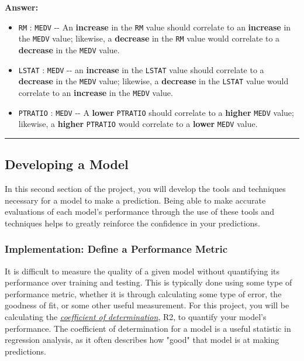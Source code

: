 \documentclass[11pt]{article}
\providecommand{\tightlist}{%
      \setlength{\itemsep}{0pt}\setlength{\parskip}{0pt}}
\begin{document}
    \textbf{Answer: }

\begin{itemize}
\tightlist
\item
  \texttt{RM} : \texttt{MEDV} -\/- An \textbf{increase} in the
  \texttt{RM} value should correlate to an \textbf{increase} in the
  \texttt{MEDV} value; likewise, a \textbf{decrease} in the \texttt{RM}
  value would correlate to a \textbf{decrease} in the \texttt{MEDV}
  value.
\item
  \texttt{LSTAT} : \texttt{MEDV} -\/- an \textbf{increase} in the
  \texttt{LSTAT} value should correlate to a \textbf{decrease} in the
  \texttt{MEDV} value; likewise, a \textbf{decrease} in the
  \texttt{LSTAT} value would correlate to an \textbf{increase} in the
  \texttt{MEDV} value.
\item
  \texttt{PTRATIO} : \texttt{MEDV} -\/- A \textbf{lower}
  \texttt{PTRATIO} should correlate to a \textbf{higher} \texttt{MEDV}
  value; likewise, a \textbf{higher} \texttt{PTRATIO} would correlate to
  a \textbf{lower} \texttt{MEDV} value.
\end{itemize}

    \begin{center}\rule{0.5\linewidth}{\linethickness}\end{center}

\subsection{Developing a Model}\label{developing-a-model}

In this second section of the project, you will develop the tools and
techniques necessary for a model to make a prediction. Being able to
make accurate evaluations of each model's performance through the use of
these tools and techniques helps to greatly reinforce the confidence in
your predictions.

    \subsubsection{Implementation: Define a Performance
Metric}\label{implementation-define-a-performance-metric}

It is difficult to measure the quality of a given model without
quantifying its performance over training and testing. This is typically
done using some type of performance metric, whether it is through
calculating some type of error, the goodness of fit, or some other
useful measurement. For this project, you will be calculating the
\href{http://stattrek.com/statistics/dictionary.aspx?definition=coefficient_of_determination}{\emph{coefficient
of determination}}, R2, to quantify your model's performance. The
coefficient of determination for a model is a useful statistic in
regression analysis, as it often describes how "good" that model is at
making predictions.
\end{document}
